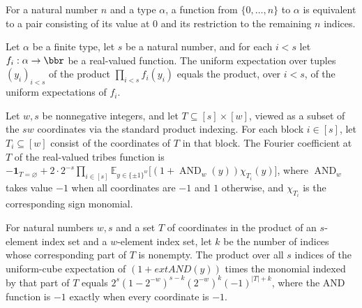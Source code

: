 \begin{definition}
\label{FABL.finArrowConsEquiv}
\leanok
For a natural number $n$ and a type $\alpha$, a function from $\{0,\ldots,n\}$ to
$\alpha$ is equivalent to a pair consisting of its value at $0$ and its restriction to
the remaining $n$ indices.
\end{definition}

\begin{theorem}
\label{FABL.expect_prod_finArrow}
\leanok
{}
Let $\alpha$ be a finite type, let $s$ be a natural number, and for each $i<s$ let
$f_i:\alpha\to\bbr$ be a real-valued function. The uniform expectation over tuples
$(y_i)_{i<s}$ of the product $\prod_{i<s} f_i(y_i)$ equals the product, over $i<s$, of
the uniform expectations of $f_i$.
\end{theorem}

\begin{theorem}
\label{FABL.fourierCoeff_tribes_eq_prod}
\leanok
{}
Let $w,s$ be nonnegative integers, and let $T\subseteq[s]\times[w]$, viewed as a subset
of the $sw$ coordinates via the standard product indexing. For each block $i\in[s]$, let
$T_i\subseteq[w]$ consist of the coordinates of $T$ in that block. The Fourier
coefficient at $T$ of the real-valued tribes function is $-\mathbf
1_{T=\varnothing}+2\cdot 2^{-s}\prod_{i\in[s]}\mathbb
E_{y\in\{\pm1\}^w}\bigl[(1+\operatorname{AND}_w(y))\chi_{T_i}(y)\bigr]$, where
$\operatorname{AND}_w$ takes value $-1$ when all coordinates are $-1$ and $1$ otherwise,
and $\chi_{T_i}$ is the corresponding sign monomial.
\end{theorem}

\begin{theorem}
\label{FABL.prod_expect_one_add_and_tribeFrequencyPart}
\leanok
{}
For natural numbers $w,s$ and a set $T$ of coordinates in the product of an $s$-element
index set and a $w$-element index set, let $k$ be the number of indices whose
corresponding part of $T$ is nonempty. The product over all $s$ indices of the
uniform-cube expectation of $(1+	ext{AND}(y))$ times the monomial indexed by that part
of $T$ equals $2^s(1-2^{-w})^{s-k}(2^{-w})^k(-1)^{|T|+k}$, where the AND function is
$-1$ exactly when every coordinate is $-1$.
\end{theorem}

